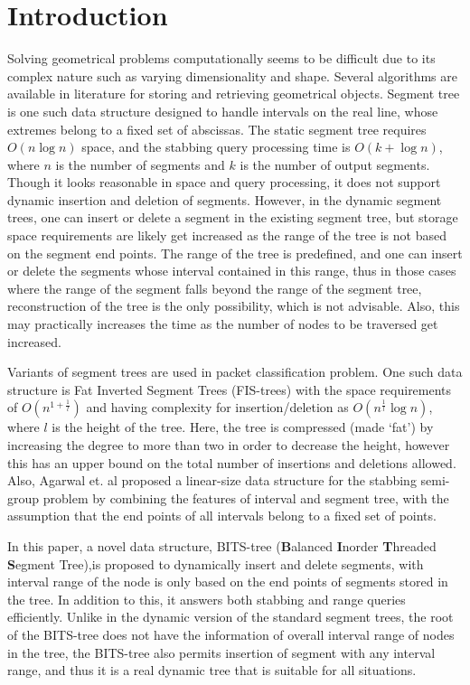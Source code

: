 \documentclass{article}
\begin{document}
\section{Introduction}
Solving geometrical problems computationally seems to be difficult due to its complex nature such as varying dimensionality and shape. Several algorithms are available in literature\cite{bcko,ps} for storing and retrieving geometrical objects. Segment tree \cite{b1} is one such data structure designed to handle intervals on the real line, whose extremes belong to a fixed set of abscissas. The static segment tree requires $O(n\log n)$ space, and the stabbing query processing time is $O(k+\log n)$, where $n$ is the number of segments and $k$ is the number of output segments. Though it looks reasonable in space and query processing, it does not support dynamic insertion and deletion of segments. However, in the dynamic segment trees, one can insert or delete a segment in the existing segment tree, but storage space requirements are likely get increased as the range of the tree is not based on the segment end points. The range of the tree is predefined, and one can insert or delete the segments whose interval contained in this range, thus in those cases where the range of the segment falls beyond the range of the segment tree, reconstruction of the tree is the only possibility, which is not advisable. Also, this may practically increases the time as the number of nodes to be traversed get increased.  
\par
Variants of segment trees are used in packet classification problem. One such data structure is Fat Inverted Segment Trees (FIS-trees) \cite{fm,t} with the space requirements of $O(n^{1+\frac{1}{l}})$ and having complexity for insertion/deletion as $O(n^\frac{1}{l}\log n)$, where $l$ is the height of the tree. Here, the tree is compressed  (made `fat') by increasing the degree to more than two in order to decrease the height, however this has an upper bound on the total number of insertions and deletions allowed. Also, Agarwal et. al \cite{aa} proposed a linear-size data structure for the stabbing semi-group problem by combining the features of interval and segment tree, with the assumption that the end points of all intervals belong to a fixed set of points. 
\par
In this paper, a novel data structure, BITS-tree (\textbf{B}alanced \textbf{I}norder \textbf{T}hreaded \textbf{S}egment Tree),is proposed to dynamically insert and delete segments, with interval range of the node is only based on the end points of segments stored in the tree. In addition to this, it answers both stabbing and range queries efficiently. Unlike in the dynamic version of the standard segment trees, the root of the BITS-tree does not have the information of overall interval range of nodes in the tree, the BITS-tree also permits insertion of segment with any interval range, and thus it is a real dynamic tree that is suitable for all situations. 
\end{document}

